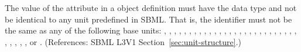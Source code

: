 The value of the  attribute in a \UnitDefinition object
definition must have the data type  and not be
identical to any unit predefined in SBML.  That is, the identifier
must not be the same as any of the following base units:
,
,
,
,
,
,
,
,
,
,
,
,
,
,
,
,
,
,
,
,
,
,
,
,
,
,
,
,
,
,
,
, or
.
(References: SBML L3V1 Section~\ref{sec:unit-structure}.)
